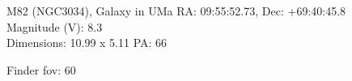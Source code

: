\begin{block}{M82 (NGC3034), Galaxy in UMa}
    RA: 09:55:52.73, Dec: +69:40:45.8 \\ 
    Magnitude (V): 8.3 \\ 
    Dimensions: 10.99 x 5.11 PA: 66 

    Finder fov: 60 
\end{block}